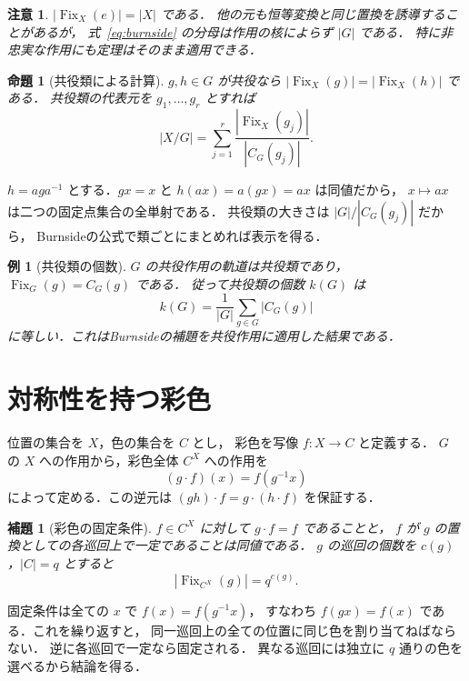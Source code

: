 \documentclass[a5paper,10pt,onecolumn]{jsarticle}
\makeatletter
\theoremstyle{mathnotetheorem}
\newtheorem{lemma}[theorem]{補題}
\newtheorem{proposition}[theorem]{命題}
\newtheorem{example}[theorem]{例}
\newtheorem{remark}[theorem]{注意}
\renewcommand{\proofname}{証明}
\renewenvironment{proof}[1][\proofname]{%
  \par\pushQED{\qed}\normalfont\topsep4\p@\@plus2\p@\relax
  \trivlist\item[\hskip\labelsep\bfseries #1]\ignorespaces
}{\popQED\endtrivlist\@endpefalse}
\makeatother
\begin{document}
\begin{remark}
$|\operatorname{Fix}_X(e)|=|X|$ である．
他の元も恒等変換と同じ置換を誘導することがあるが，
式~\eqref{eq:burnside} の分母は作用の核によらず $|G|$ である．
特に非忠実な作用にも定理はそのまま適用できる．
\end{remark}

\begin{proposition}[共役類による計算]\label{prop:conjfix}
$g,h\in G$ が共役なら
$|\operatorname{Fix}_X(g)|=|\operatorname{Fix}_X(h)|$ である．
共役類の代表元を $g_1,\ldots,g_r$ とすれば
\[
 |X/G|=\sum_{j=1}^r
 \frac{|\operatorname{Fix}_X(g_j)|}{|C_G(g_j)|}.
\]
\end{proposition}
\begin{proof}
$h=aga^{-1}$ とする．$gx=x$ と
$h(ax)=a(gx)=ax$ は同値だから，
$x\mapsto ax$ は二つの固定点集合の全単射である．
共役類の大きさは $|G|/|C_G(g_j)|$ だから，
Burnsideの公式で類ごとにまとめれば表示を得る．
\end{proof}

\begin{example}[共役類の個数]
$G$ の共役作用の軌道は共役類であり，
$\operatorname{Fix}_G(g)=C_G(g)$ である．
従って共役類の個数 $k(G)$ は
\[
 k(G)=\frac1{|G|}\sum_{g\in G}|C_G(g)|
\]
に等しい．これはBurnsideの補題を共役作用に適用した結果である．
\end{example}

\section{対称性を持つ彩色}
位置の集合を $X$，色の集合を $C$ とし，
彩色を写像 $f:X\to C$ と定義する．
$G$ の $X$ への作用から，彩色全体 $C^X$ への作用を
\[
 (g\cdot f)(x)=f(g^{-1}x)
\]
によって定める．この逆元は $(gh)\cdot f=g\cdot(h\cdot f)$ を保証する．

\begin{lemma}[彩色の固定条件]\label{lem:colorfix}
$f\in C^X$ に対して $g\cdot f=f$ であることと，
$f$ が $g$ の置換としての各巡回上で一定であることは同値である．
$g$ の巡回の個数を $c(g)$，$|C|=q$ とすると
\[
 |\operatorname{Fix}_{C^X}(g)|=q^{c(g)}.
\]
\end{lemma}
\begin{proof}
固定条件は全ての $x$ で $f(x)=f(g^{-1}x)$，
すなわち $f(gx)=f(x)$ である．これを繰り返すと，
同一巡回上の全ての位置に同じ色を割り当てねばならない．
逆に各巡回で一定なら固定される．
異なる巡回には独立に $q$ 通りの色を選べるから結論を得る．
\end{proof}
\end{document}
